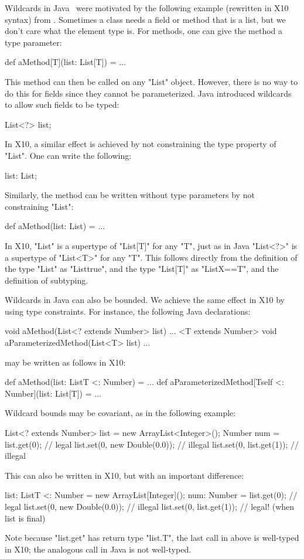 \documentclass[preprint,nocopyrightspace,9pt]{sigplanconf}
\begin{document}
Wildcards in Java~\cite{Java3,adding-wildcards} were motivated
by the following example (rewritten in X10 syntax)
from \cite{adding-wildcards}.
Sometimes a class needs a field or method
that is a list, but we don't care what the element type is.
For methods, one can give the method a type parameter:
\begin{xten}
def aMethod[T](list: List[T]) = { ... }
\end{xten}
This method can then be called on any \xcd"List" object.
However, there is no way to do this for fields since they
cannot be parameterized.
Java introduced wildcards to allow such fields to be
typed:
\begin{xten}
List<?> list;
\end{xten}
In X10, a similar effect is achieved by not constraining the
type property of \xcd"List".
One can write the following:
\begin{xten}
list: List;
\end{xten}
Similarly, the method can be written without type parameters by
not constraining \xcd"List":
\begin{xten}
def aMethod(list: List) = { ... }
\end{xten}

In X10, \xcd"List"
is a supertype of
\xcd"List[T]" for any \xcd"T",
just as in Java
\xcd"List<?>" is a supertype of
\xcd"List<T>" for any \xcd"T".
This follows directly from the definition of the type \xcd"List"
as \xcd"List{true}", and the type \xcd"List[T]"
as \xcd"List{X==T}", and the definition of subtyping.

Wildcards in Java can also be bounded.
We achieve the same
effect in X10 by using type constraints.
For instance, the following Java declarations:
\begin{xten}
void aMethod(List<? extends Number> list) { ... }
<T extends Number> void aParameterizedMethod(List<T> list) { ... }
\end{xten}
may be written as follows in X10:
\begin{xten}
def aMethod(list: List{T <: Number}) = { ... }
def aParameterizedMethod[T{self <: Number}](list: List[T]) = { ... }
\end{xten}

Wildcard bounds may be covariant, as in the following example:
\begin{xten}
List<? extends Number> list = new ArrayList<Integer>();
Number num = list.get(0);     // legal
list.set(0, new Double(0.0)); // illegal
list.set(0, list.get(1));     // illegal
\end{xten}
This can also be written in X10, but with an important
difference:
\begin{xten}
list: List{T <: Number} = new ArrayList[Integer]();
num: Number = list.get(0);    // legal
list.set(0, new Double(0.0)); // illegal
list.set(0, list.get(1));     // legal! (when list is final)
\end{xten}
Note because \xcd"list.get" has return type \xcd"list.T", the
last call in above is well-typed in X10; the analogous call in
Java is not well-typed.
\end{document}
